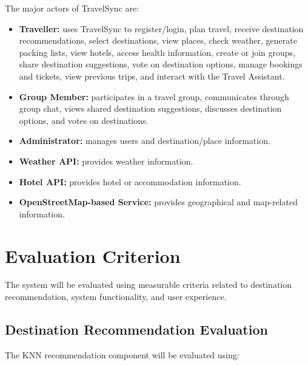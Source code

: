 \documentclass[11pt,a4paper]{article}
\begin{document}
The major actors of TravelSync are:

\begin{itemize}

\item \textbf{Traveller:} uses TravelSync to register/login, plan travel, receive destination recommendations, select destinations, view places, check weather, generate packing lists, view hotels, access health information, create or join groups, share destination suggestions, vote on destination options, manage bookings and tickets, view previous trips, and interact with the Travel Assistant.

\item \textbf{Group Member:} participates in a travel group, communicates through group chat, views shared destination suggestions, discusses destination options, and votes on destinations.

\item \textbf{Administrator:} manages users and destination/place information.

\item \textbf{Weather API:} provides weather information.

\item \textbf{Hotel API:} provides hotel or accommodation information.

\item \textbf{OpenStreetMap-based Service:} provides geographical and map-related information.

\end{itemize}



\section{Evaluation Criterion}

The system will be evaluated using measurable criteria related to destination recommendation, system functionality, and user experience.

\subsection{Destination Recommendation Evaluation}

The KNN recommendation component will be evaluated using:
\end{document}
